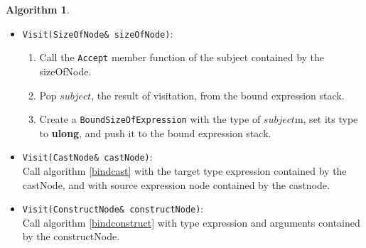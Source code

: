 \documentclass[a4paper,oneside,11pt]{book}
\theoremstyle{definition}
\newtheorem{algo}{Algorithm}[section]
\begin{document}
\begin{algo}
\begin{itemize}
\begin{enumerate}
Let $typeExpr$ be the right side of \textbf{as}-expression contained by asNode.
\item
Call the \verb|Accept| member function of $expr$.
\item
Pop $boundExpr$, the result of visitation, from the bound expression stack.
\item
Let $exprType$ be type of $boundExpr$.
\item
If $exprType$ is not 'pointer to class type', report error and exit.
\item
Otherwise, let $exprClassType$ be the base type of $exprType$.
\item
If $exprClassType$ is not polymorphic (\ref{virtualclass}), report error and exit.
\item
Otherwise, resolve type of $typeExpr$ using algorithm \ref{resolvetype}. Let $type$ be the type resolved.
\item
If $type$ is not 'pointer to class type', report error and exit.
\item
Otherwise, let $rightClassType$ be the base type of $type$.
\item
If $rightClassType$ is not polymorphic (\ref{virtualclass}), report error and exit.
\item
Otherwise, create a \verb|BoundAsExpression| with $boundExpr$, $exprClassType$ and $rightClassType$, set its type to $type$,
and push it to the bound expression stack.
\end{enumerate}
\item
\verb|Visit(SizeOfNode& sizeOfNode)|:\\
\begin{enumerate}
\item
Call the \verb|Accept| member function of the subject contained by the sizeOfNode.
\item
Pop $subject$, the result of visitation, from the bound expression stack.
\item
Create a \verb|BoundSizeOfExpression| with the type of $subject$m, set its type to \textbf{ulong}, and push it to the bound expression stack.
\end{enumerate}
\item
\verb|Visit(CastNode& castNode)|:\\
Call algorithm \ref{bindcast} with the target type expression contained by the castNode, and with source expression node contained by the castnode.
\item
\verb|Visit(ConstructNode& constructNode)|:\\
Call algorithm \ref{bindconstruct} with type expression and arguments contained by the constructNode.

\end{itemize}
\end{algo}
\end{document}
